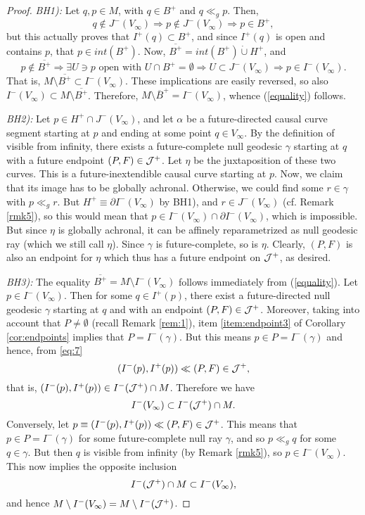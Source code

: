 \begin{proof}
  \textit{BH1):} Let $q,p \in M$, with $q \in B^+$ and $q \ll_g p$. Then,
\[
q \notin J^-(V_{\infty}) \Longrightarrow p \notin  J^-(V_{\infty}) \Longrightarrow p \in B^+,
\]
but this actually proves that $I^+(q) \subset B^+$, and since $I^+(q)$ is open and contains $p$, that $p \in int(B^+)$. Now, $\overline{B^+} = int(B^+)\dot{\cup} H^+$, and
\[
p \notin \overline{B^+} \Longrightarrow \exists U \ni p \mbox{ open with }U \cap B^+ =\emptyset \Longrightarrow U \subset J^-(V_{\infty}) \Longrightarrow p \in I^-(V_{\infty}).
\]
That is, $M \setminus \overline{B^+} \subset I^-(V_{\infty})$. These implications are easily reversed, so also $I^-(V_{\infty}) \subset M \setminus \overline{B^+}$. Therefore, $M\setminus\overline{B}^+=I^{-}(V_{\infty})$, whence (\ref{equality}) follows.

\smallskip

\textit{BH2):} Let $p \in H^+\cap J^-(V_{\infty})$, and let $\alpha$ be a future-directed causal curve segment starting at $p$ and ending at some point $q \in V_{\infty}$. By the definition of visible from infinity, there exists a future-complete null geodesic $\gamma$ starting at $q$ with a future endpoint $(P,F) \in {\cal J}^+$. Let $\eta$ be the juxtaposition of these two curves. This is a future-inextendible causal curve starting at $p$. Now, we claim that its image has to be globally achronal. Otherwise, we could find some $r \in \gamma$ with $p \ll_g r$. But $H^+ \equiv \partial I^-(V_{\infty})$ by BH1), and $r \in J^-(V_{\infty})$ (cf. Remark \ref{rmk5}), so this would mean that $p \in I^-(V_{\infty})\cap \partial I^-(V_{\infty})$, which is impossible. But since $\eta$ is globally achronal, it can be affinely reparametrized as null geodesic ray (which we still call $\eta$). Since $\gamma$ is future-complete, so is $\eta$. Clearly, $(P,F)$ is also an endpoint for $\eta$ which thus has a future endpoint on ${\cal J}^+$, as desired.

\smallskip

\textit{BH3):} The equality $\overline{B^+} = M \setminus I^-(V_{\infty})$ follows immediately from (\ref{equality}). Let $p \in I^-(V_{\infty})$. Then for some $q \in I^+(p)$, there exist a future-directed  null geodesic $\gamma$ starting at $q$ and with an endpoint $(P,F) \in {\cal J}^+$. Moreover, taking into account that $P\neq \emptyset$ (recall Remark \ref{rem:1}), item \ref{item:endpoint3} of Corollary \ref{cor:endpoints} implies that $P=I^{-}(\gamma)$. But this means $p \in P=I^-(\gamma)$ and hence, from \eqref{eq:7}
\[
(I^-(p),I^+(p))\ll (P,F) \in {\cal J}^+,
\]
that is, $(I^-(p),I^+(p)) \in I^-({\cal J}^+)\cap M$. Therefore  we have
\[
I^-(V_{\infty}) \subset I^-({\cal J}^+) \cap M.
\]
Conversely, let $p\equiv (I^-(p),I^+(p)) \ll (P,F) \in {\cal J}^+$. This means that $p \in P=I^-(\gamma)$ for some future-complete  null ray $\gamma$, and so $p\ll_g q$ for some $q \in \gamma$. But then $q$ is visible from infinity (by Remark \ref{rmk5}), so $p \in I^-(V_{\infty})$. This now implies the opposite inclusion \[ I^-({\cal J}^+) \cap M\subset I^-(V_{\infty}), \] and hence $M \setminus I^-(V_{\infty}) = M \setminus I^-({\cal J}^+)$.


\end{proof}
